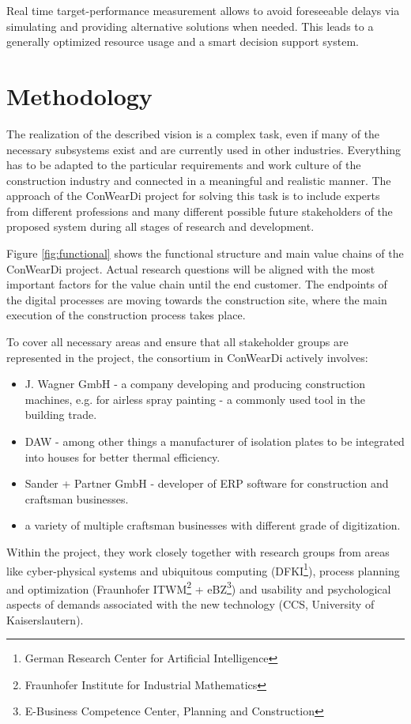 Real time target-performance measurement allows to avoid foreseeable delays via simulating and providing alternative solutions when needed. This leads to a generally optimized resource usage and a smart decision support system.


\section{Methodology}
The realization of the described vision is a complex task, even if many of the necessary subsystems exist and are currently used in other industries. 
Everything has to be adapted to the particular requirements and work culture of the construction industry and connected in a meaningful and realistic manner. 
The approach of the ConWearDi project for solving this task is to include experts from different professions and many different possible future stakeholders of the proposed system during all stages of research and development.
 
Figure \ref{fig:functional} shows the functional structure and main value chains of the ConWearDi project. Actual research questions will be aligned with the most important factors for the value chain until the end customer. 
The endpoints of the digital processes are moving towards the construction site, where the main execution of the construction process takes place.

To cover all necessary areas and ensure that all stakeholder groups are represented in the project, the consortium in ConWearDi actively involves:
\begin{itemize}
  \item J. Wagner GmbH - a company developing and producing construction machines, e.g. for airless spray painting - a commonly used tool in the building trade.
  \item DAW - among other things a manufacturer of isolation plates to be integrated into houses for better thermal efficiency.
  \item Sander + Partner GmbH - developer of ERP software for construction and craftsman businesses.
  \item a variety of multiple craftsman businesses with different grade of digitization.
\end{itemize}
Within the project, they work closely together with research groups from areas like cyber-physical systems and ubiquitous computing (DFKI\footnote{German Research Center for Artificial Intelligence}), process planning and optimization (Fraunhofer ITWM\footnote{Fraunhofer Institute for Industrial Mathematics} + eBZ\footnote{E-Business Competence Center, Planning and Construction}) and usability and psychological aspects of demands associated with the new technology (CCS, University of Kaiserslautern).

